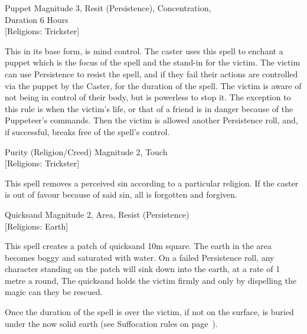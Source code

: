 \begin{samepage}
\begin{rpg-spell}
{Puppet}
{Magnitude 3, Resit (Persistence), Concentration,\\Duration 6 Hours\\{[Religions: Trickster]}}

This in its base form, is mind control. The caster uses this spell to enchant a puppet which is the focus of the spell and the stand-in for the victim. The victim can use Persistence to resist the spell, and if they fail their actions are controlled via the puppet by the Caster, for the duration of the spell. The victim is aware of not being in control of their body, but is powerless to stop it. The exception to this rule is when the victim’s life, or that of a friend is in danger because of the Puppeteer’s commands. Then the victim is allowed another Persistence roll, and, if successful, breaks free of the spell’s control.
\end{rpg-spell}
\end{samepage}

\begin{samepage}
\begin{rpg-spell}
{Purity (Religion/Creed)}
{Magnitude 2, Touch\\{[Religions: Trickster]}}

This spell removes a perceived sin according to a particular religion. If the caster is out of favour because of said sin, all is forgotten and forgiven.
\end{rpg-spell}
\end{samepage}

\begin{samepage}
\begin{rpg-spell}
{Quicksand}
{Magnitude 2, Area, Resist (Persistence)\\{[Religions: Earth]}}

This spell creates a patch of quicksand 10m square. The earth in the area becomes boggy and saturated with water. On a failed Persistence roll, any character standing on the patch will sink down into the earth, at a rate of 1 metre a round, The quicksand holds the victim firmly and only by dispelling the magic can they be rescued.

Once the duration of the spell is over the victim, if not on the surface, is buried under the now solid earth (see Suffocation rules on page~\pageref{ssec:suffocation}).
\end{rpg-spell}
\end{samepage}

